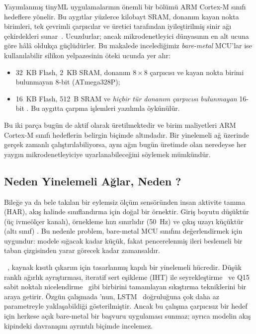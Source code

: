 Yayımlanmış tinyML uygulamalarının önemli bir bölümü ARM Cortex-M
sınıfı hedeflere yönelir. Bu aygıtlar yüzlerce kilobayt SRAM,
donanım kayan nokta birimleri, tek çevrimli çarpıcılar ve üretici
tarafından iyileştirilmiş sinir ağı çekirdekleri
sunar~\cite{lai2018cmsisnn,david2021tflitemicro,lin2020mcunet}.
Ucuzdurlar; ancak mikrodenetleyici dünyasının en alt ucuna göre
hâlâ oldukça güçlüdürler. Bu makalede incelediğimiz \emph{bare-metal}
MCU'lar ise kullanılabilir silikon yelpazesinin öteki ucunda
yer alır:
\begin{itemize}
\item 32~KB Flash, 2~KB SRAM, donanım $8{\times}8$ çarpıcısı ve
kayan nokta birimi bulunmayan 8-bit \arduino{} (ATmega328P);
\item 16~KB Flash, 512~B SRAM ve \emph{hiçbir tür donanım çarpıcısı
bulunmayan} 16-bit \msp{}. Bu aygıtta çarpma işlemleri yazılımla
öykünülür.
\end{itemize}
Bu iki parça bugün de aktif olarak üretilmektedir ve birim maliyetleri
ARM Cortex-M sınıfı hedeflerin belirgin biçimde altındadır. Bir
yinelemeli ağ \msp{} üzerinde gerçek zamanlı çalıştırılabiliyorsa,
aynı ağın bugün üretimde olan neredeyse her yaygın mikrodenetleyiciye
uyarlanabileceğini söylemek mümkündür.

\subsection{Neden Yinelemeli Ağlar, Neden \fastgrnn{}?}

Bileğe ya da bele takılan bir eylemsiz ölçüm sensöründen insan
aktivite tanıma (HAR), akış halinde sınıflandırma için doğal bir
örnektir. Giriş boyutu düşüktür (üç ivmeölçer kanalı), örnekleme
hızı sınırlıdır (50~Hz) ve çıkış uzayı küçüktür (altı sınıf)
\cite{anguita2013public,reyes2015transition}. Bu nedenle problem,
bare-metal MCU sınıfını değerlendirmek için uygundur: modele
sığacak kadar küçük, fakat pencerelenmiş ileri beslemeli bir taban
çizgisinden yarar görecek kadar zamansaldır.

\fastgrnn{}~\cite{kusupati2018fastgrnn}, kaynak kısıtlı çıkarım
için tasarlanmış kapılı bir yinelemeli hücredir. Düşük ranklı
ağırlık ayrıştırması, iteratif sert eşikleme (IHT) ile
seyrekleştirme~\cite{blumensath2009iht} ve Q15 sabit noktalı
nicelendirme~\cite{jacob2018integer,han2016deepcompression} gibi
birbirini tamamlayan sıkıştırma tekniklerini bir araya getirir.
Özgün çalışmada \fastgrnn{}'nun, LSTM~\cite{hochreiter1997lstm}
doğruluğuna çok daha az parametreyle yaklaşabildiği gösterilmiştir.
Ancak bu çalışma çarpıcısız bir hedef için herkese açık bare-metal
bir başvuru uygulaması sunmaz; ayrıca modelin akış kipindeki
davranışını ayrıntılı biçimde incelemez.

